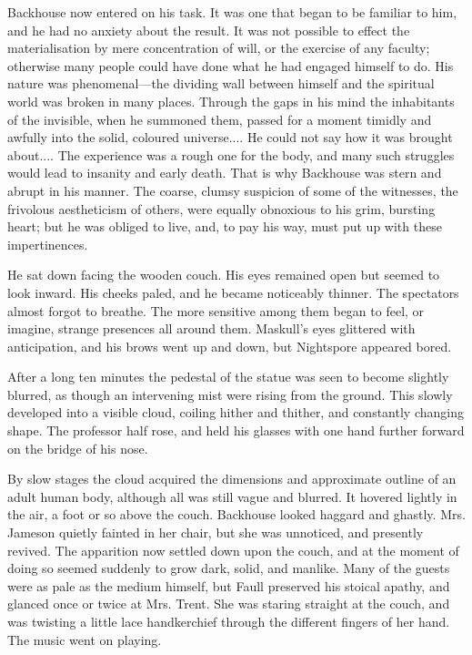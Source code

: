 Backhouse now entered on his task. It was one that began to be familiar to him, and he had no anxiety about the result. It was not possible to effect the materialisation by mere concentration of will, or the exercise of any faculty; otherwise many people could have done what he had engaged himself to do. His nature was phenomenal—the dividing wall between himself and the spiritual world was broken in many places. Through the gaps in his mind the inhabitants of the invisible, when he summoned them, passed for a moment timidly and awfully into the solid, coloured universe.... He could not say how it was brought about.... The experience was a rough one for the body, and many such struggles would lead to insanity and early death. That is why Backhouse was stern and abrupt in his manner. The coarse, clumsy suspicion of some of the witnesses, the frivolous aestheticism of others, were equally obnoxious to his grim, bursting heart; but he was obliged to live, and, to pay his way, must put up with these impertinences.

He sat down facing the wooden couch. His eyes remained open but seemed to look inward. His cheeks paled, and he became noticeably thinner. The spectators almost forgot to breathe. The more sensitive among them began to feel, or imagine, strange presences all around them. Maskull's eyes glittered with anticipation, and his brows went up and down, but Nightspore appeared bored.

After a long ten minutes the pedestal of the statue was seen to become slightly blurred, as though an intervening mist were rising from the ground. This slowly developed into a visible cloud, coiling hither and thither, and constantly changing shape. The professor half rose, and held his glasses with one hand further forward on the bridge of his nose.

By slow stages the cloud acquired the dimensions and approximate outline of an adult human body, although all was still vague and blurred. It hovered lightly in the air, a foot or so above the couch. Backhouse looked haggard and ghastly. Mrs. Jameson quietly fainted in her chair, but she was unnoticed, and presently revived. The apparition now settled down upon the couch, and at the moment of doing so seemed suddenly to grow dark, solid, and manlike. Many of the guests were as pale as the medium himself, but Faull preserved his stoical apathy, and glanced once or twice at Mrs. Trent. She was staring straight at the couch, and was twisting a little lace handkerchief through the different fingers of her hand. The music went on playing.

